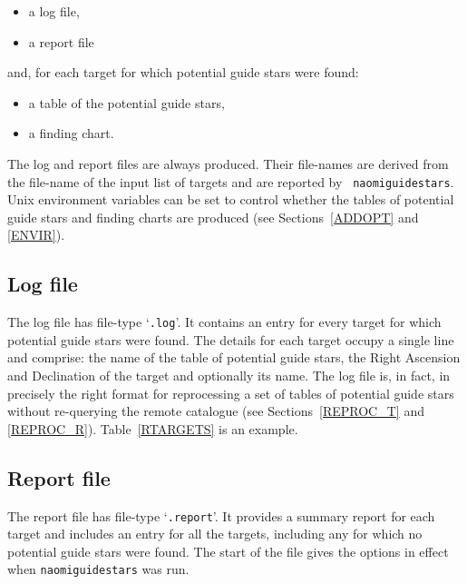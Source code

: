 \documentclass[twoside,11pt]{article}
\renewcommand{\_}{\texttt{\symbol{95}}}
\begin{document}
\begin{itemize}

  \item a log file,

  \item a report file

\end{itemize}

and, for each target for which potential guide stars were found:

\begin{itemize}

  \item a table of the potential guide stars,

  \item a finding chart.

\end{itemize}

The log and report files are always produced.  Their file-names are derived
from the file-name of the input list of targets and are reported by {\tt
naomiguidestars}.  Unix environment variables can be set to control whether
the tables of potential guide stars and finding charts are produced (see
Sections~\ref{ADDOPT} and \ref{ENVIR}).

\subsection{Log file}

The log file has file-type `{\tt .log}'.  It contains an entry for every
target for which potential guide stars were found.  The details for each
target occupy a single line and comprise: the name of the table of
potential guide stars, the Right Ascension and Declination of the target
and optionally its name.  The log file is, in fact, in precisely the
right format for reprocessing a set of tables of potential guide
stars without re-querying the remote catalogue (see Sections~\ref{REPROC_T}
and \ref{REPROC_R}).  Table~\ref{RTARGETS} is an example.

\subsection{Report file}

The report file has file-type `{\tt .report}'.  It provides a summary
report for each target and includes an entry for all the targets, including
any for which no potential guide stars were found.  The start of the file
gives the options in effect when {\tt naomiguidestars} was run.
\end{document}
